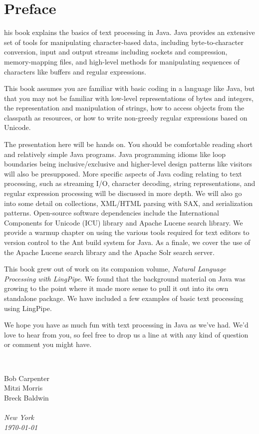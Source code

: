 \chapter*{Preface}
\pagestyle{fancy}%

his book explains the basics of text processing in Java.  
Java provides an extensive set of tools for manipulating
character-based data, including byte-to-character conversion, input
and output streams including sockets and compression, memory-mapping
files, and high-level methods for manipulating sequences of characters
like buffers and regular expressions.

This book assumes you are familiar with basic coding in a language like
Java, but that you may not be familiar with low-level representations
of bytes and integers, the representation and manipulation of
strings, how to access objects from the classpath as resources,
or how to write non-greedy regular expressions based on Unicode.

The presentation here will be hands on.  You should be comfortable
reading short and relatively simple Java programs.  Java programming
idioms like loop boundaries being inclusive/exclusive and higher-level
design patterns like visitors will also be presupposed.  More specific
aspects of Java coding relating to text processing, such as streaming
I/O, character decoding, string representations, and regular
expression processing will be discussed in more depth.  We will also
go into some detail on collections, XML/HTML parsing with SAX, and
serialization patterns.  Open-source software dependencies include the
International Components for Unicode (ICU) library and Apache Lucene
search library.  We provide a warmup chapter on using the various
tools required for text editors to version control to the Ant build
system for Java.  As a finale, we cover the use of the Apache Lucene
search library and the Apache Solr search server.

This book grew out of work on its companion volume, {\it Natural
Language Processing with LingPipe}.  We found that the background material
on Java was growing to the point where it made more sense to pull it
out into its own standalone package.  We have included a few examples
of basic text processing using LingPipe. 

We hope you have as much fun with text processing in Java as we've
had.  We'd love to hear from you, so feel free to drop us a line at
 with any kind of question or comment you
might have.

\vspace*{0.125in}

\newlength{\sigWidth}
\mbox{ }
\hfill
\parbox{\sigWidth}{
Bob Carpenter
\\[2pt]
Mitzi Morris
\\[2pt]
Breck Baldwin
\\[2pt]\small
\\
\it New York
\\
\today}

